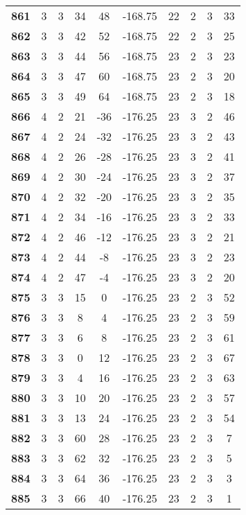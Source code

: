 \documentclass{article}%
\begin{document}
\begin{longtable}{cccccccccc}
        \textbf{861} & 3 & 3 & 34 & 48 & -168.75 & 22 & 2 & 3 & 33 \\ 
        \textbf{862} & 3 & 3 & 42 & 52 & -168.75 & 22 & 2 & 3 & 25 \\ 
        \textbf{863} & 3 & 3 & 44 & 56 & -168.75 & 23 & 2 & 3 & 23 \\ 
        \textbf{864} & 3 & 3 & 47 & 60 & -168.75 & 23 & 2 & 3 & 20 \\ 
        \textbf{865} & 3 & 3 & 49 & 64 & -168.75 & 23 & 2 & 3 & 18 \\ 
        \textbf{866} & 4 & 2 & 21 & -36 & -176.25 & 23 & 3 & 2 & 46 \\ 
        \textbf{867} & 4 & 2 & 24 & -32 & -176.25 & 23 & 3 & 2 & 43 \\ 
        \textbf{868} & 4 & 2 & 26 & -28 & -176.25 & 23 & 3 & 2 & 41 \\ 
        \textbf{869} & 4 & 2 & 30 & -24 & -176.25 & 23 & 3 & 2 & 37 \\ 
        \textbf{870} & 4 & 2 & 32 & -20 & -176.25 & 23 & 3 & 2 & 35 \\ 
        \textbf{871} & 4 & 2 & 34 & -16 & -176.25 & 23 & 3 & 2 & 33 \\ 
        \textbf{872} & 4 & 2 & 46 & -12 & -176.25 & 23 & 3 & 2 & 21 \\ 
        \textbf{873} & 4 & 2 & 44 & -8 & -176.25 & 23 & 3 & 2 & 23 \\ 
        \textbf{874} & 4 & 2 & 47 & -4 & -176.25 & 23 & 3 & 2 & 20 \\ 
        \textbf{875} & 3 & 3 & 15 & 0 & -176.25 & 23 & 2 & 3 & 52 \\ 
        \textbf{876} & 3 & 3 & 8 & 4 & -176.25 & 23 & 2 & 3 & 59 \\ 
        \textbf{877} & 3 & 3 & 6 & 8 & -176.25 & 23 & 2 & 3 & 61 \\ 
        \textbf{878} & 3 & 3 & 0 & 12 & -176.25 & 23 & 2 & 3 & 67 \\ 
        \textbf{879} & 3 & 3 & 4 & 16 & -176.25 & 23 & 2 & 3 & 63 \\ 
        \textbf{880} & 3 & 3 & 10 & 20 & -176.25 & 23 & 2 & 3 & 57 \\ 
        \textbf{881} & 3 & 3 & 13 & 24 & -176.25 & 23 & 2 & 3 & 54 \\ 
        \textbf{882} & 3 & 3 & 60 & 28 & -176.25 & 23 & 2 & 3 & 7 \\ 
        \textbf{883} & 3 & 3 & 62 & 32 & -176.25 & 23 & 2 & 3 & 5 \\ 
        \textbf{884} & 3 & 3 & 64 & 36 & -176.25 & 23 & 2 & 3 & 3 \\ 
        \textbf{885} & 3 & 3 & 66 & 40 & -176.25 & 23 & 2 & 3 & 1 \\ \hline
\end{longtable}
\end{document}
